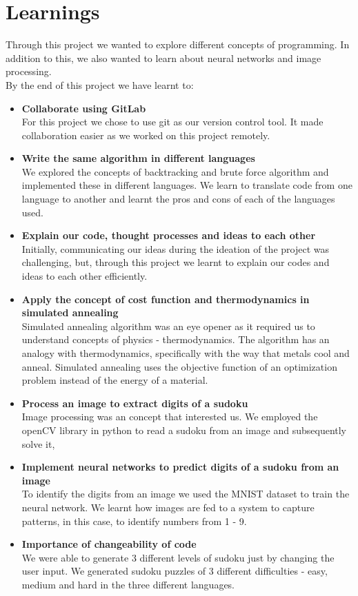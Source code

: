 \documentclass[12pt]{article}
\begin{document}
    \section{Learnings}
    Through this project we wanted to explore different concepts of programming. In addition to this, we also wanted to learn about neural networks and image processing.\\
    By the end of this project we have learnt to:
     \begin{itemize}
		 \item \textbf{Collaborate using GitLab}\\
		 For this project we chose to use git as our version control tool. It made collaboration easier as we worked on this project remotely. 
		 \item \textbf{Write the same algorithm in different languages}\\
		 We explored the concepts of backtracking and brute force algorithm and implemented these in different languages. We learn to translate code from one language to another and learnt the pros and cons of each of the languages used. 
		 \item \textbf{Explain our code, thought processes and ideas to each other}\\
		 Initially, communicating our ideas during the ideation of the project was challenging, but, through this project we learnt to explain our codes and ideas to each other efficiently.
		 \item \textbf{Apply the concept of cost function and thermodynamics in simulated annealing}\\
		 Simulated annealing algorithm was an eye opener as it required us to understand concepts of physics - thermodynamics.  The algorithm has an analogy with thermodynamics, specifically with the way that metals cool and anneal.  Simulated annealing uses the objective function of an optimization problem instead of the energy of a material.
		 \item \textbf{Process an image to extract digits of a sudoku}\\
		 Image processing was an concept that interested us. We employed the openCV library in python to read a sudoku from an image and subsequently solve it,
		 \item \textbf{Implement neural networks to predict digits of a sudoku from an image}\\
		 To identify the digits from an image we used the MNIST dataset to train the neural network. We learnt how images are fed to a system to capture patterns, in this case, to identify numbers from 1 - 9.
		 \item \textbf{Importance of changeability of code}\\
		 We were able to generate 3 different levels of sudoku just by changing the user input. We generated sudoku puzzles of 3 different difficulties - easy, medium and hard in the three different languages.
	 \end{itemize}
	 
\end{document}
